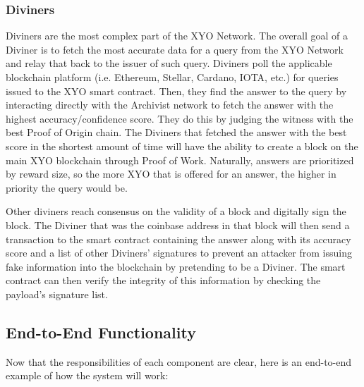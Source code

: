 \documentclass{article}
\begin{document}
\subsubsection{Diviners}

Diviners are the most complex part of the XYO Network. The overall goal of a Diviner is to fetch the most accurate data for a query from the XYO Network and relay that back to the issuer of such query. Diviners poll the applicable blockchain platform (i.e. Ethereum, Stellar, Cardano, IOTA, etc.) for queries issued to the XYO smart contract. Then, they find the answer to the query by interacting directly with the Archivist network to fetch the answer with the highest accuracy/confidence score. They do this by judging the witness with the best Proof of Origin chain. The Diviners that fetched the answer with the best score in the shortest amount of time will have the ability to create a block on the main XYO blockchain through Proof of Work. Naturally, answers are prioritized by reward size, so the more XYO that is offered for an answer, the higher in priority the query would be.

Other diviners reach consensus on the validity of a block and digitally sign the block. The Diviner that was the coinbase address in that block will then send a transaction to the smart contract containing the answer along with its accuracy score and a list of other Diviners' signatures to prevent an attacker from issuing fake information into the blockchain by pretending to be a Diviner. The smart contract can then verify the integrity of this information by checking the payload's signature list.

\subsection{End-to-End Functionality}

Now that the responsibilities of each component are clear, here is an end-to-end example of how the system will work:
\end{document}
